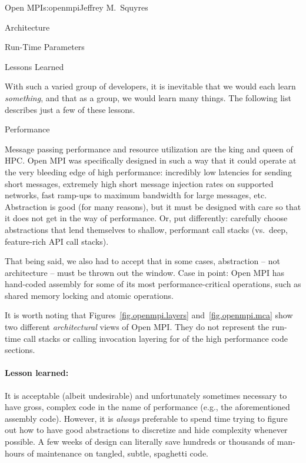 \begin{aosachapter}{Open MPI}{s:openmpi}{Jeffrey M.\ Squyres}
\begin{aosasect1}{Architecture}
\begin{aosasect2}{Run-Time Parameters}
\end{aosasect2}

\end{aosasect1}


\begin{aosasect1}{Lessons Learned}

With such a varied group of developers, it is inevitable that we would
each learn {\em something}, and that as a group, we would learn many
things.  The following list describes just a few of these lessons.


\begin{aosasect2}{Performance}

Message passing performance and resource utilization are the king
and queen of HPC.
%
Open MPI was specifically designed in such a way that it could operate
at the very bleeding edge of high performance: incredibly low
latencies for sending short messages, extremely high short message
injection rates on supported networks, fast ramp-ups to maximum
bandwidth for large messages, etc.
%
Abstraction is good (for many reasons), but it must be designed with
care so that it does not get in the way of performance.  Or, put
differently: carefully choose abstractions that lend themselves to
shallow, performant call stacks (vs.\ deep, feature-rich API call
stacks).

That being said, we also had to accept that in some cases, abstraction
-- not architecture -- must be thrown out the window.  Case in point:
Open MPI has hand-coded assembly for some of its most
performance-critical operations, such as shared memory locking and
atomic operations.

It is worth noting that Figures~\ref{fig.openmpi.layers}
and~\ref{fig.openmpi.mca} show two different {\em architectural} views
of Open MPI.
%
They do not represent the run-time call stacks or calling invocation
layering for of the high performance code sections.


\paragraph{Lesson learned:} 

It is acceptable (albeit undesirable) and unfortunately sometimes
necessary to have gross, complex code in the name of performance
(e.g., the aforementioned assembly code).
%
However, it is {\em always} preferable to spend time trying to figure
out how to have good abstractions to discretize and hide complexity
whenever possible.  A few weeks of design can literally save hundreds
or thousands of man-hours of maintenance on tangled, subtle, spaghetti
code.


\end{aosasect2}
\end{aosasect1}
\end{aosachapter}
